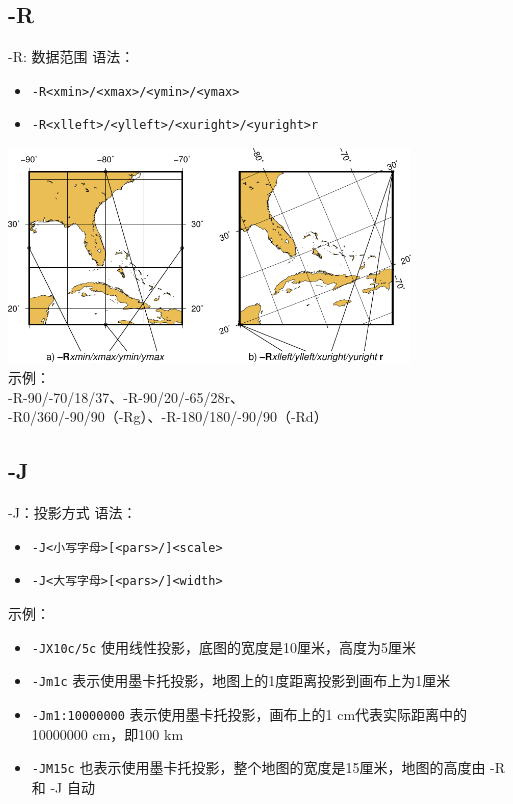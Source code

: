 \documentclass[UTF8, 11pt]{ctexbeamer}
\begin{document}
\subsection{-R}
\begin{frame}[fragile]{-R: 数据范围}
语法：
\begin{itemize}
\item \verb|-R<xmin>/<xmax>/<ymin>/<ymax>|
\item \verb|-R<xlleft>/<ylleft>/<xuright>/<yuright>r|
\end{itemize}
\includegraphics[width=0.8\textwidth]{GMT_-R}\\
示例：\\
-R-90/-70/18/37、-R-90/20/-65/28r、\\
-R0/360/-90/90（-Rg）、-R-180/180/-90/90（-Rd）
\end{frame}

\subsection{-J}
\begin{frame}[fragile]{-J：投影方式}
语法：
\begin{itemize}
\item \verb|-J<小写字母>[<pars>/]<scale>|
\item \verb|-J<大写字母>[<pars>/]<width>|
\end{itemize}
示例：
\begin{itemize}
\item \verb|-JX10c/5c| 使用线性投影，底图的宽度是10厘米，高度为5厘米
\item \verb|-Jm1c| 表示使用墨卡托投影，地图上的1度距离投影到画布上为1厘米
\item \verb|-Jm1:10000000| 表示使用墨卡托投影，画布上的1 cm代表实际距离中的10000000 cm，即100 km
\item \verb|-JM15c| 也表示使用墨卡托投影，整个地图的宽度是15厘米，地图的高度由 -R 和 -J 自动
\end{itemize}
\end{frame}
\end{document}
